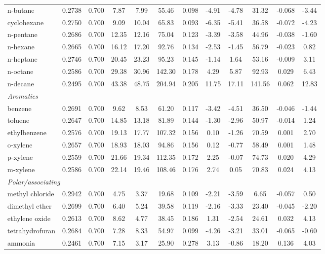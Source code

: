 \begin{table}[H]
\begin{tabular}{lccccccccccc}
n-butane & 0.2738 & 0.700 & 7.87 & 7.99 & 55.46 & 0.098 & -4.91 & -4.78 & 31.32 & -0.068 & -3.44 \\
cyclohexane & 0.2750 & 0.700 & 9.09 & 10.04 & 65.83 & 0.093 & -6.35 & -5.41 & 36.58 & -0.072 & -4.23 \\
n-pentane & 0.2686 & 0.700 & 12.35 & 12.16 & 75.04 & 0.123 & -3.39 & -3.58 & 44.96 & -0.038 & -1.60 \\
n-hexane & 0.2665 & 0.700 & 16.12 & 17.20 & 92.76 & 0.134 & -2.53 & -1.45 & 56.79 & -0.023 & 0.82 \\
n-heptane & 0.2746 & 0.700 & 20.45 & 23.23 & 95.23 & 0.145 & -1.14 & 1.64 & 53.16 & -0.009 & 3.11 \\
n-octane & 0.2586 & 0.700 & 29.38 & 30.96 & 142.30 & 0.178 & 4.29 & 5.87 & 92.93 & 0.029 & 6.43 \\
n-decane & 0.2495 & 0.700 & 43.38 & 48.75 & 204.94 & 0.205 & 11.75 & 17.11 & 141.56 & 0.062 & 12.83 \\
\multicolumn{12}{l}{\emph{Aromatics}} \\
benzene & 0.2691 & 0.700 & 9.62 & 8.53 & 61.20 & 0.117 & -3.42 & -4.51 & 36.50 & -0.046 & -1.44 \\
toluene & 0.2647 & 0.700 & 14.85 & 13.18 & 81.89 & 0.144 & -1.30 & -2.96 & 50.97 & -0.014 & 1.24 \\
ethylbenzene & 0.2576 & 0.700 & 19.13 & 17.77 & 107.32 & 0.156 & 0.10 & -1.26 & 70.59 & 0.001 & 2.70 \\
o-xylene & 0.2657 & 0.700 & 18.93 & 18.03 & 94.86 & 0.156 & 0.12 & -0.77 & 58.49 & 0.001 & 1.48 \\
p-xylene & 0.2559 & 0.700 & 21.66 & 19.34 & 112.35 & 0.172 & 2.25 & -0.07 & 74.73 & 0.020 & 4.29 \\
m-xylene & 0.2586 & 0.700 & 22.14 & 19.46 & 108.46 & 0.176 & 2.74 & 0.05 & 70.83 & 0.024 & 4.13 \\
\multicolumn{12}{l}{\emph{Polar/associating}} \\
methyl chloride & 0.2942 & 0.700 & 4.75 & 3.37 & 19.68 & 0.109 & -2.21 & -3.59 & 6.65 & -0.057 & 0.50 \\
dimethyl ether & 0.2699 & 0.700 & 6.40 & 5.24 & 39.58 & 0.119 & -2.16 & -3.33 & 23.40 & -0.045 & -2.20 \\
ethylene oxide & 0.2613 & 0.700 & 8.62 & 4.77 & 38.45 & 0.186 & 1.31 & -2.54 & 24.61 & 0.032 & 4.13 \\
tetrahydrofuran & 0.2684 & 0.700 & 7.28 & 8.33 & 54.97 & 0.099 & -4.26 & -3.21 & 33.01 & -0.065 & -0.60 \\
ammonia & 0.2461 & 0.700 & 7.15 & 3.17 & 25.90 & 0.278 & 3.13 & -0.86 & 18.20 & 0.136 & 4.03 \\

\end{tabular}
\end{table}
